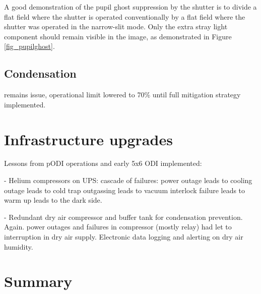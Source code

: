 \documentclass[draft]{spieman}
\begin{document}
A good demonstration of the pupil ghost suppression by the shutter is to divide
a flat field where the shutter is operated conventionally by a flat field where
the shutter was operated in the narrow-slit mode. Only the extra stray light
component should remain visible in the image, as demonstrated in Figure
\ref{fig_pupilghost}.


\subsection{Condensation}

remains issue, operational limit lowered to 70\% until full mitigation
strategy implemented.



\section{Infrastructure upgrades}

Lessons from pODI operations and early 5x6 ODI implemented:

- Helium compressors on UPS: cascade of failures: power outage leads to cooling outage leads to 
cold trap outgassing leads to vacuum interlock failure leads to warm up leads to the dark side. 

- Redundant dry air compressor and buffer tank for condensation prevention. Again. power outages 
and failures in compressor (mostly relay) had let to interruption in dry air supply.  Electronic 
data logging and alerting on dry air humidity.




\section{Summary}


 

\end{document}
